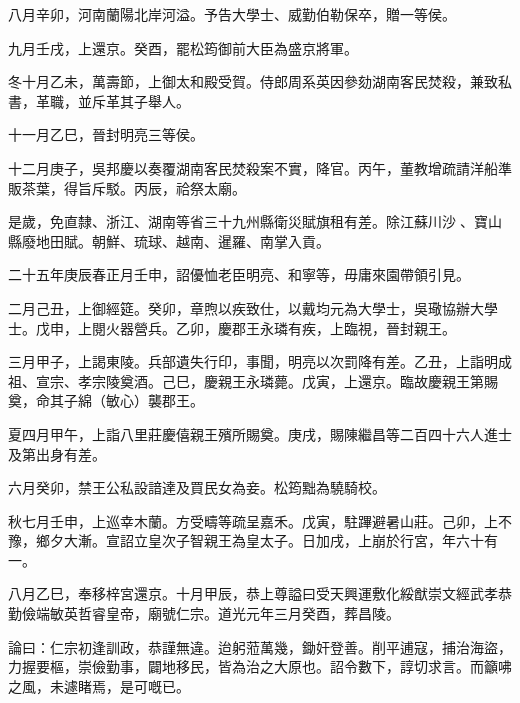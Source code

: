 \begin{pinyinscope}
八月辛卯，河南蘭陽北岸河溢。予告大學士、威勤伯勒保卒，贈一等侯。

九月壬戌，上還京。癸酉，罷松筠御前大臣為盛京將軍。

冬十月乙未，萬壽節，上御太和殿受賀。侍郎周系英因參劾湖南客民焚殺，兼致私書，革職，並斥革其子舉人。

十一月乙巳，晉封明亮三等侯。

十二月庚子，吳邦慶以奏覆湖南客民焚殺案不實，降官。丙午，董教增疏請洋船準販茶葉，得旨斥駁。丙辰，祫祭太廟。

是歲，免直隸、浙江、湖南等省三十九州縣衛災賦旗租有差。除江蘇川沙、寶山縣廢地田賦。朝鮮、琉球、越南、暹羅、南掌入貢。

二十五年庚辰春正月壬申，詔優恤老臣明亮、和寧等，毋庸來園帶領引見。

二月己丑，上御經筵。癸卯，章煦以疾致仕，以戴均元為大學士，吳璥協辦大學士。戊申，上閱火器營兵。乙卯，慶郡王永璘有疾，上臨視，晉封親王。

三月甲子，上謁東陵。兵部遺失行印，事聞，明亮以次罰降有差。乙丑，上詣明成祖、宣宗、孝宗陵奠酒。己巳，慶親王永璘薨。戊寅，上還京。臨故慶親王第賜奠，命其子綿（敏心）襲郡王。

夏四月甲午，上詣八里莊慶僖親王殯所賜奠。庚戌，賜陳繼昌等二百四十六人進士及第出身有差。

六月癸卯，禁王公私設諳達及買民女為妾。松筠黜為驍騎校。

秋七月壬申，上巡幸木蘭。方受疇等疏呈嘉禾。戊寅，駐蹕避暑山莊。己卯，上不豫，鄉夕大漸。宣詔立皇次子智親王為皇太子。日加戌，上崩於行宮，年六十有一。

八月乙巳，奉移梓宮還京。十月甲辰，恭上尊謚曰受天興運敷化綏猷崇文經武孝恭勤儉端敏英哲睿皇帝，廟號仁宗。道光元年三月癸酉，葬昌陵。

論曰：仁宗初逢訓政，恭謹無違。迨躬蒞萬幾，鋤奸登善。削平逋寇，捕治海盜，力握要樞，崇儉勤事，闢地移民，皆為治之大原也。詔令數下，諄切求言。而籲咈之風，未遽睹焉，是可嘅已。


\end{pinyinscope}
